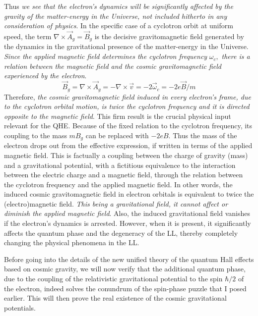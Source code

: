 \documentclass[aps,preprint,12pt,tightenlines]{revtex4}%
\begin{document}
Thus \emph{we see that the electron's dynamics will be significantly affected
by the gravity of the matter-energy in the Universe, not included hitherto in
any consideration of physics}. In the specific case of a cyclotron orbit at
uniform speed, the term $\nabla\times\vec{A}_{g}=\vec{B}_{g}$ is the decisive
gravitomagnetic field generated by the dynamics in the gravitational presence
of the matter-energy in the Universe. \emph{Since the applied magnetic field
determines the cyclotron frequency }$\omega_{c},$\emph{ there is a relation
between the magnetic field and the cosmic gravitomagnetic field experienced by
the electron}.
\begin{equation}
\vec{B}_{g}=\nabla\times\vec{A}_{g}=-\nabla\times\vec{v}=-2\vec{\omega}%
_{c}=-2e\vec{B}/m
\end{equation}
Therefore, \textit{the cosmic gravitomagnetic field induced in every
electron's frame, due to the cyclotron orbital motion, is twice the cyclotron
frequency and it is directed opposite to the magnetic field}. This firm
result is the crucial physical input relevant for the QHE. Because of the
fixed relation to the cyclotron frequency, its coupling to the mass $mB_{g}$
can be replaced with $-2eB.$ Thus the mass of the electron drops out from the
effective expression, if written in terms of the applied magnetic field. This
is factually a coupling between the charge of gravity (mass) and a
gravitational potential, with a fictitious equivalence to the interaction
between the electric charge and a magnetic field, through the relation between
the cyclotron frequency and the applied magnetic field. In other words, the
induced cosmic gravitomagnetic field in electron orbitals is equivalent to
twice the (electro)magnetic field. \emph{This being a gravitational field, it
cannot affect or diminish the applied magnetic field}. Also, the induced
gravitational field vanishes if the electron's dynamics is arrested. However,
when it is present, it significantly affects the quantum phase and the
degeneracy of the LL, thereby completely changing the physical
phenomena in the LL.

Before going into the details of the new unified theory of the quantum Hall
effects based on cosmic gravity, we will now verify that the additional
quantum phase, due to the coupling of the relativistic gravitational potential
to the spin $\hbar/2$ of the electron, indeed solves the conundrum of the spin-phase
puzzle that I posed earlier. This will then prove the real existence of the
cosmic gravitational potentials.
\end{document}
